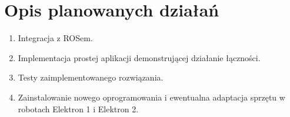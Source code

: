 \documentclass[10pt,a4paper]{article}
\begin{document}
	\section{Opis planowanych działań}
	\begin{enumerate}
		\item Integracja z ROSem.
		\item Implementacja prostej aplikacji demonstrującej działanie łączności.
		\item Testy zaimplementowanego rozwiązania. 
		\item Zainstalowanie nowego oprogramowania i ewentualna adaptacja sprzętu w robotach Elektron 1 i Elektron 2.
	\end{enumerate}
\end{document}
